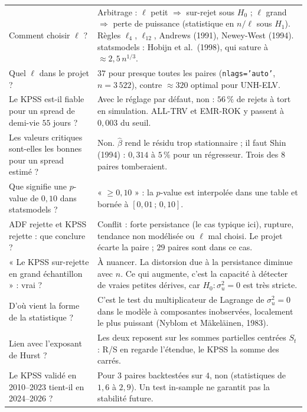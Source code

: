 \documentclass[11pt,a4paper]{article}
\newcommand{\code}[1]{\texttt{#1}}
\theoremstyle{definition}
\begin{document}
\begin{center}
\begin{longtable}{@{}>{\raggedright}p{5.2cm}>{\raggedright\arraybackslash}p{10.3cm}@{}}
Comment choisir $\ell$ ? & Arbitrage : $\ell$ petit $\Rightarrow$ sur-rejet sous $H_0$ ; $\ell$ grand $\Rightarrow$ perte de puissance (statistique en $n/\ell$ sous $H_1$). Règles $\ell_4$, $\ell_{12}$, Andrews (1991), Newey-West (1994). statsmodels : Hobijn et al.\ (1998), qui sature à $\approx 2{,}5\,n^{1/3}$. \\
\addlinespace
Quel $\ell$ dans le projet ? & $37$ pour presque toutes les paires (\code{nlags='auto'}, $n = 3\,522$), contre $\approx 320$ optimal pour UNH-ELV. \\
\addlinespace
Le KPSS est-il fiable pour un spread de demi-vie $55$ jours ? & Avec le réglage par défaut, non : $56\,\%$ de rejets à tort en simulation. ALL-TRV et EMR-ROK y passent à $0{,}003$ du seuil. \\
\addlinespace
Les valeurs critiques sont-elles les bonnes pour un spread estimé ? & Non. $\hat\beta$ rend le résidu trop stationnaire ; il faut Shin (1994) : $0{,}314$ à $5\,\%$ pour un régresseur. Trois des $8$ paires tomberaient. \\
\addlinespace
Que signifie une $p$-value de $0{,}10$ dans statsmodels ? & « $\ge 0{,}10$ » : la $p$-value est interpolée dans une table et bornée à $[0{,}01\,;\,0{,}10]$. \\
\addlinespace
ADF rejette et KPSS rejette : que conclure ? & Conflit : forte persistance (le cas typique ici), rupture, tendance non modélisée ou $\ell$ mal choisi. Le projet écarte la paire ; $29$ paires sont dans ce cas. \\
\addlinespace
« Le KPSS sur-rejette en grand échantillon » : vrai ? & À nuancer. La distorsion due à la persistance diminue avec $n$. Ce qui augmente, c'est la capacité à détecter de vraies petites dérives, car $H_0 : \sigma_u^2 = 0$ est très stricte. \\
\addlinespace
D'où vient la forme de la statistique ? & C'est le test du multiplicateur de Lagrange de $\sigma_u^2 = 0$ dans le modèle à composantes inobservées, localement le plus puissant (Nyblom et Mäkeläinen, 1983). \\
\addlinespace
Lien avec l'exposant de Hurst ? & Les deux reposent sur les sommes partielles centrées $S_t$ : R/S en regarde l'étendue, le KPSS la somme des carrés. \\
\addlinespace
Le KPSS validé en 2010--2023 tient-il en 2024--2026 ? & Pour $3$ paires backtestées sur $4$, non (statistiques de $1{,}6$ à $2{,}9$). Un test in-sample ne garantit pas la stabilité future. \\
\bottomrule
\end{longtable}
\end{center}
\end{document}
